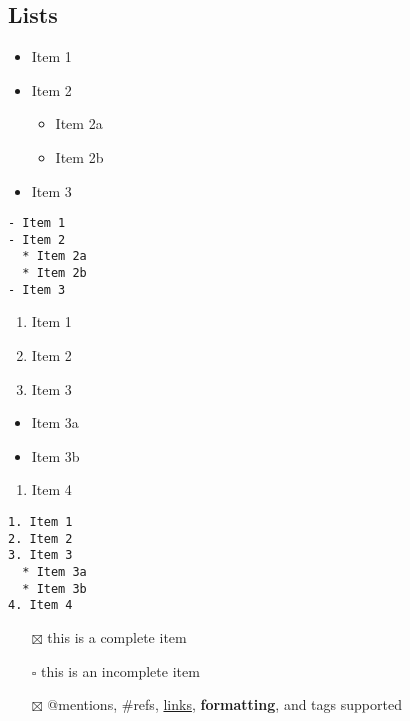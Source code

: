 \documentclass[
]{article}
\providecommand{\tightlist}{%
  \setlength{\itemsep}{0pt}\setlength{\parskip}{0pt}}
\begin{document}
\hypertarget{lists}{%
\subsection{Lists}\label{lists}}

\begin{itemize}
\tightlist
\item
  Item 1
\item
  Item 2

  \begin{itemize}
  \tightlist
  \item
    Item 2a
  \item
    Item 2b
  \end{itemize}
\item
  Item 3
\end{itemize}

\begin{verbatim}
- Item 1
- Item 2
  * Item 2a
  * Item 2b
- Item 3
\end{verbatim}

\begin{enumerate}
\def\labelenumi{\arabic{enumi}.}
\tightlist
\item
  Item 1
\item
  Item 2
\item
  Item 3
\end{enumerate}

\begin{itemize}
\tightlist
\item
  Item 3a
\item
  Item 3b
\end{itemize}

\begin{enumerate}
\def\labelenumi{\arabic{enumi}.}
\setcounter{enumi}{3}
\tightlist
\item
  Item 4
\end{enumerate}

\begin{verbatim}
1. Item 1
2. Item 2
3. Item 3
  * Item 3a
  * Item 3b
4. Item 4
\end{verbatim}

\begin{itemize}
\tightlist
\item[$\boxtimes$]
  this is a complete item
\item[$\square$]
  this is an incomplete item
\item[$\boxtimes$]
  @mentions, \#refs, \href{}{links}, \textbf{formatting}, and tags
  supported
\end{itemize}
\end{document}
